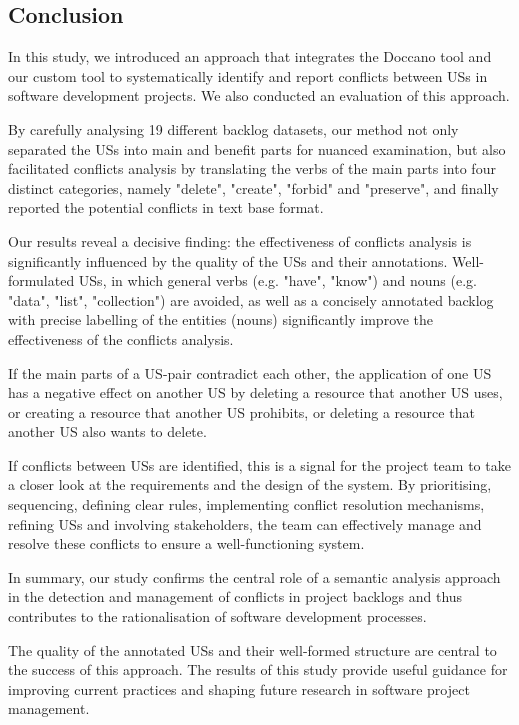 \subsection{Conclusion}\label{conflict_conclustion}
In this study, we introduced an approach that integrates the Doccano tool and our custom tool to systematically identify and report conflicts between USs in software development projects. We also conducted an evaluation of this approach.

By carefully analysing 19 different backlog datasets, our method not only separated the USs into main and benefit parts for nuanced examination, but also facilitated conflicts analysis by translating the verbs of the main parts into four distinct categories, namely "delete", "create", "forbid" and "preserve", and finally reported the potential conflicts in text base format.

Our results reveal a decisive finding: the effectiveness of conflicts analysis is significantly influenced by the quality of the USs and their annotations. Well-formulated USs, in which general verbs (e.g. "have", "know") and nouns (e.g. "data", "list", "collection") are avoided, as well as a concisely annotated backlog with precise labelling of the entities (nouns) significantly improve the effectiveness of the conflicts analysis.

 If the main parts of a US-pair contradict each other, the application of one US has a negative effect on another US by deleting a resource that another US uses, or creating a resource that another US prohibits, or deleting a resource that another US also wants to delete.
 
 If conflicts between USs are identified, this is a signal for the project team to take a closer look at the requirements and the design of the system. By prioritising, sequencing, defining clear rules, implementing conflict resolution mechanisms, refining USs and involving stakeholders, the team can effectively manage and resolve these conflicts to ensure a well-functioning system.
 
In summary, our study confirms the central role of a semantic analysis approach in the detection and management of conflicts in project backlogs and thus contributes to the rationalisation of software development processes.

The quality of the annotated USs and their well-formed structure are central to the success of this approach. The results of this study provide useful guidance for improving current practices and shaping future research in software project management.
